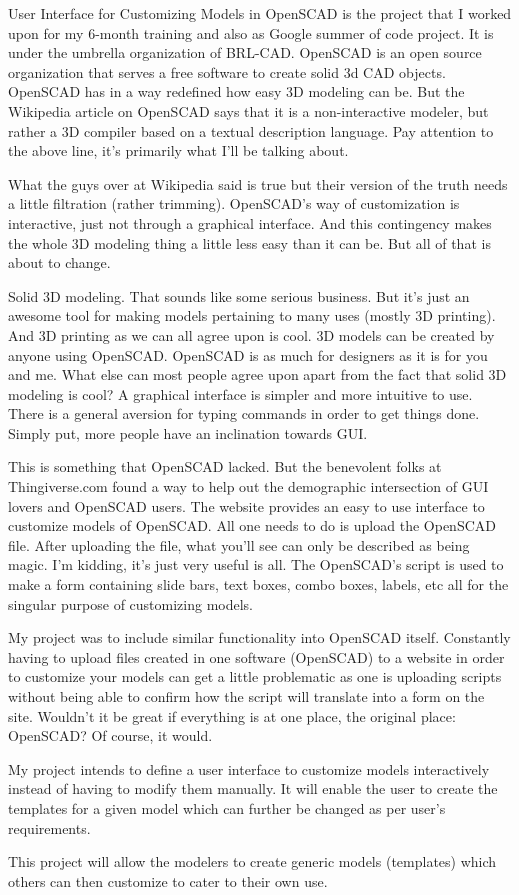 \begin{Large}
\end{Large}


User Interface for Customizing Models in OpenSCAD is the project that I worked upon for my 6-month training and also as Google summer of code project. It is under the umbrella organization of BRL-CAD. OpenSCAD is an open source organization that serves a free software to create solid 3d CAD objects. OpenSCAD has in a way redefined how easy 3D modeling can be. But the Wikipedia article on OpenSCAD says that it is a non-interactive modeler, but rather a 3D compiler based on a textual description language. Pay attention to the above line, it’s primarily what I’ll be talking about.

What the guys over at Wikipedia said is true but their version of the truth needs a little filtration (rather trimming). OpenSCAD’s way of customization is interactive, just not through a graphical interface. And this contingency makes the whole 3D modeling thing a little less easy than it can be. But all of that is about to change.

Solid 3D modeling. That sounds like some serious business. But it’s just an awesome tool for making models pertaining to many uses (mostly 3D printing). And 3D printing as we can all agree upon is cool. 3D models can be created by anyone using OpenSCAD. OpenSCAD is as much for designers as it is for you and me. What else can most people agree upon apart from the fact that solid 3D modeling is cool? A graphical interface is simpler and more intuitive to use. There is a general aversion for typing commands in order to get things done. Simply put, more people have an inclination towards GUI.

This is something that OpenSCAD lacked. But the benevolent folks at Thingiverse.com found a way to help out the demographic intersection of GUI lovers and OpenSCAD users. The website provides an easy to use interface to customize models of OpenSCAD. All one needs to do is upload the OpenSCAD file. After uploading the file, what you’ll see can only be described as being magic. I’m kidding, it’s just very useful is all. The OpenSCAD’s script is used to make a form containing slide bars, text boxes, combo boxes, labels, etc all for the singular purpose of customizing models.

My project was to include similar functionality into OpenSCAD itself. Constantly having to upload files created in one software (OpenSCAD) to a website in order to customize your models can get a little problematic as one is uploading scripts without being able to confirm how the script will translate into a form on the site. Wouldn’t it be great if everything is at one place, the original place: OpenSCAD? Of course, it would.

My project intends to define a user interface to customize models interactively instead of having to modify them manually. It will enable the user to create the templates for a given model which can further be changed as per user’s requirements.

This project will allow the modelers to create generic models (templates) which others can then customize to cater to their own use.